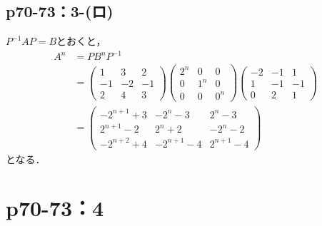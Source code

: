 \documentclass[a4paper,10pt,fleqn]{ltjsarticle}
\begin{document}
\subsection*{p70-73：3-(ロ)}


\begin{tleftbar}
    $P^{-1} A P = B$とおくと，
    \begin{align*}
        A^n & = P B^n P^{-1}                                                                                                                                                                                                      \\
            & = \begin{pmatrix} 1 & 3 & 2 \\ -1 & -2 & -1 \\ 2 & 4 & 3 \end{pmatrix} \begin{pmatrix} 2^n & 0 & 0 \\ 0 & 1^n & 0 \\ 0 & 0 & 0^n \end{pmatrix} \begin{pmatrix} -2 & -1 & 1\\ 1 & -1 & -1 \\ 0 & 2 & 1 \end{pmatrix} \\
            & = \begin{pmatrix} -2^{n+1}+3 & -2^n -3 & 2^n -3 \\ 2^{n+1}-2 & 2^n +2 & -2^n -2 \\ -2^{n+2}+4 & -2^{n+1} -4 & 2^{n+1} -4 \end{pmatrix}
    \end{align*}
    となる．
\end{tleftbar}
\newpage


\section*{p70-73：4}
\end{document}
